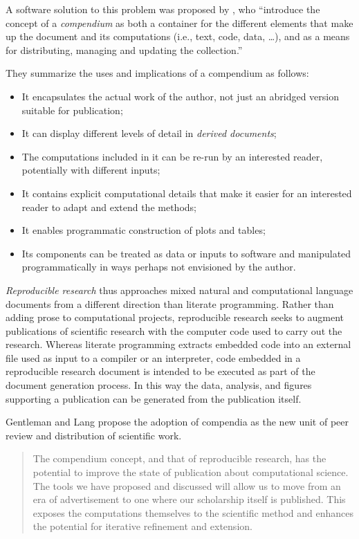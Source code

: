 \documentclass[article,shortnames]{jss}
\begin{document}
A software solution to this problem was proposed by
\citet{compendium}, who ``introduce the concept of a \emph{compendium} as
both a container for the different elements that make up the document
and its computations (i.e., text, code, data, \ldots{}), and as a means for
distributing, managing and updating the collection.''

They summarize the uses and implications of a compendium as follows:

\begin{itemize}
\item It encapsulates the actual work of the author, not just an
    abridged version suitable for publication;
\item It can display different levels of detail in \emph{derived documents};
\item The computations included in it can be re-run by an interested
    reader, potentially with different inputs;
\item It contains explicit computational details that make it easier for
    an interested reader to adapt and extend the methods;
\item It enables programmatic construction of plots and tables;
\item Its components can be treated as data or inputs to software and
    manipulated programmatically in ways perhaps not envisioned by
    the author.
\end{itemize}

\emph{Reproducible research} thus approaches mixed natural and
computational language documents from a different direction than
literate programming.  Rather than adding prose to computational
projects, reproducible research seeks to augment publications of
scientific research with the computer code used to carry out the
research.  Whereas literate programming extracts embedded code into an
external file used as input to a compiler or an interpreter, code
embedded in a reproducible research document is intended to be
executed as part of the document generation process.  In this way the
data, analysis, and figures supporting a publication can be generated
from the publication itself.

Gentleman and Lang propose the adoption of compendia as the
new unit of peer review and distribution of scientific work.

\begin{quote}
The compendium concept, and that of reproducible research, has the
potential to improve the state of publication about computational
science. The tools we have proposed and discussed will allow us to
move from an era of advertisement to one where our scholarship itself
is published. This exposes the computations themselves to the
scientific method and enhances the potential for iterative refinement
and extension.  \citep{compendium}
\end{quote}
\end{document}
